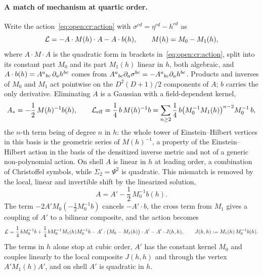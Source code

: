 \paragraph{A match of mechanism at quartic order.}
Write the action~\eqref{eq:open:cr:action} with $\sigma^{cd} = \eta^{cd} - h^{cd}$ as
\begin{equation}
  \label{eq:open:cr:split}
  {\mathcal{L}}
    = - A \cdot M(h) \cdot A
    - A \cdot b(h),
  \qquad
  M(h)
    = M_0 - M_1(h),
\end{equation}
where $A \cdot M \cdot A$ is the quadratic form in brackets in~\eqref{eq:open:cr:action}, split into its constant part $M_0$ and its part $M_1(h)$ linear in $h$, both algebraic, and $A \cdot b(h) = A^a{}_{bc} \, \partial_a h^{bc}$ comes from $A^a{}_{bc} \partial_a \sigma^{bc} = - A^a{}_{bc} \partial_a h^{bc}$.
Products and inverses of $M_0$ and $M_1$ act pointwise on the $D^2 (D + 1) / 2$ components of $A$; $b$ carries the only derivative.
Eliminating $A$ is a Gaussian with a field-dependent kernel,
\begin{equation}
  \label{eq:open:cr:eliminate}
  A_*
    = - \frac{1}{2} \, M(h)^{-1} b(h),
  \qquad
  {\mathcal{L}}_{\rm eff}
    = \frac{1}{4} \, b \, M(h)^{-1} b
    = \sum_{n \ge 2} \frac{1}{4} \, b \bigl( M_0^{-1} M_1(h) \bigr)^{n - 2} M_0^{-1} \, b,
\end{equation}
the $n$-th term being of degree $n$ in $h$: the whole tower of Einstein--Hilbert vertices in this basis is the geometric series of $M(h)^{-1}$, a property of the Einstein--Hilbert action in the basis of the densitized inverse metric and not of a generic non-polynomial action.
On shell $A$ is linear in $h$ at leading order, a combination of Christoffel symbols, while $\Sigma_2 = \Psi^2$ is quadratic.
This mismatch is removed by the local, linear and invertible shift by the linearized solution,
\begin{equation}
  \label{eq:open:cr:shift}
  A
    = A' - \frac{1}{2} \, M_0^{-1} b(h).
\end{equation}
The term $- 2 A' M_0 (- \tfrac{1}{2} M_0^{-1} b)$ cancels $- A' \cdot b$, the cross term from $M_1$ gives a coupling of $A'$ to a bilinear composite, and the action becomes
\begin{equation}
  \label{eq:open:cr:shifted}
  {\mathcal{L}}
    = \frac{1}{4} \, b M_0^{-1} b
    + \frac{1}{4} \, b M_0^{-1} M_1(h) M_0^{-1} b
    - A' \cdot \bigl( M_0 - M_1(h) \bigr) \cdot A'
    - A' \cdot J(h, h),
  \qquad
  J(h, h)
    := M_1(h) \, M_0^{-1} b(h).
\end{equation}
The terms in $h$ alone stop at cubic order, $A'$ has the constant kernel $M_0$ and couples linearly to the local composite $J(h, h)$ and through the vertex $A' M_1(h) A'$, and on shell $A'$ is quadratic in $h$.
